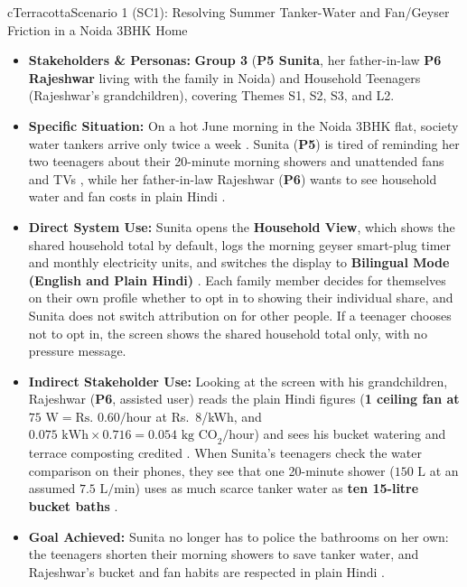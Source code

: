 \documentclass[12pt, a4paper]{article}
\begin{document}
\begin{scenariocard}{cTerracotta}{Scenario 1 (SC1): Resolving Summer Tanker-Water and Fan/Geyser Friction in a Noida 3BHK Home}
\begin{itemize}
    \item \textbf{Stakeholders \& Personas:} \textbf{Group 3} (\textbf{P5 Sunita}, her father-in-law \textbf{P6 Rajeshwar} living with the family in Noida) and Household Teenagers (Rajeshwar's grandchildren), covering Themes S1, S2, S3, and L2.
    \item \textbf{Specific Situation:} On a hot June morning in the Noida 3BHK flat, society water tankers arrive only twice a week \cite{cf3}. Sunita (\textbf{P5}) is tired of reminding her two teenagers about their 20-minute morning showers and unattended fans and TVs \cite{cf3}, while her father-in-law Rajeshwar (\textbf{P6}) wants to see household water and fan costs in plain Hindi \cite{cf8}.
    \item \textbf{Direct System Use:} Sunita opens the \textbf{Household View}, which shows the shared household total by default, logs the morning geyser smart-plug timer and monthly electricity units, and switches the display to \textbf{Bilingual Mode (English and Plain Hindi)} \cite{cf3}. Each family member decides for themselves on their own profile whether to opt in to showing their individual share, and Sunita does not switch attribution on for other people. If a teenager chooses not to opt in, the screen shows the shared household total only, with no pressure message.
    \item \textbf{Indirect Stakeholder Use:} Looking at the screen with his grandchildren, Rajeshwar (\textbf{P6}, assisted user) reads the plain Hindi figures (\textbf{1 ceiling fan at $75\text{ W} = \text{Rs.\ } 0.60/\text{hour}$} at Rs.\ 8/kWh, and $0.075\text{ kWh} \times 0.716 = 0.054\text{ kg CO}_2/\text{hour}$) and sees his bucket watering and terrace composting credited \cite{cf3, cf8}. When Sunita's teenagers check the water comparison on their phones, they see that one 20-minute shower ($150\text{ L}$ at an assumed $7.5\text{ L/min}$) uses as much scarce tanker water as \textbf{ten 15-litre bucket baths} \cite{cf3}.
    \item \textbf{Goal Achieved:} Sunita no longer has to police the bathrooms on her own: the teenagers shorten their morning showers to save tanker water, and Rajeshwar's bucket and fan habits are respected in plain Hindi \cite{cf3, cf8}.
\end{itemize}
\end{scenariocard}
\end{document}
